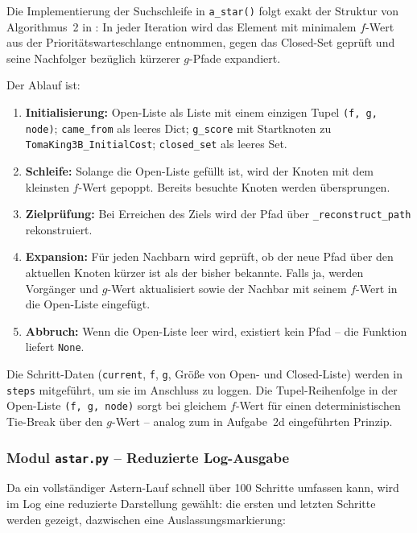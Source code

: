 Die Implementierung der Suchschleife in \texttt{a\_star()} folgt exakt der Struktur
von Algorithmus~2 in \textcite[S. 21\,f.]{5}: In jeder Iteration wird das Element
mit minimalem \(f\)-Wert aus der Prioritätswarteschlange entnommen, gegen das
Closed-Set geprüft und seine Nachfolger bezüglich kürzerer \(g\)-Pfade expandiert.

Der Ablauf ist:
\begin{enumerate}
    \item \textbf{Initialisierung:} Open-Liste als Liste mit einem einzigen Tupel \texttt{(f, g, node)}; \texttt{came\_from} als leeres Dict; \texttt{g\_score} mit Startknoten zu \texttt{TomaKing3B\_InitialCost}; \texttt{closed\_set} als leeres Set.
    \item \textbf{Schleife:} Solange die Open-Liste gefüllt ist, wird der Knoten mit dem kleinsten \(f\)-Wert gepoppt. Bereits besuchte Knoten werden übersprungen.
    \item \textbf{Zielprüfung:} Bei Erreichen des Ziels wird der Pfad über \texttt{\_reconstruct\_path} rekonstruiert.
    \item \textbf{Expansion:} Für jeden Nachbarn wird geprüft, ob der neue Pfad über den aktuellen Knoten kürzer ist als der bisher bekannte. Falls ja, werden Vorgänger und \(g\)-Wert aktualisiert sowie der Nachbar mit seinem \(f\)-Wert in die Open-Liste eingefügt.
    \item \textbf{Abbruch:} Wenn die Open-Liste leer wird, existiert kein Pfad -- die Funktion liefert \texttt{None}.
\end{enumerate}

Die Schritt-Daten (\texttt{current}, \texttt{f}, \texttt{g}, Größe von Open- und Closed-Liste) werden in \texttt{steps} mitgeführt, um sie im Anschluss zu loggen. Die Tupel-Reihenfolge in der Open-Liste \texttt{(f, g, node)} sorgt bei gleichem \(f\)-Wert für einen deterministischen Tie-Break über den \(g\)-Wert -- analog zum in Aufgabe~2d eingeführten Prinzip.


\subsubsection{Modul \texttt{astar.py} – Reduzierte Log-Ausgabe}

Da ein vollständiger \acs{Astern}-Lauf schnell über 100 Schritte umfassen kann, wird im Log eine reduzierte Darstellung gewählt: die ersten und letzten Schritte werden gezeigt, dazwischen eine Auslassungsmarkierung:

